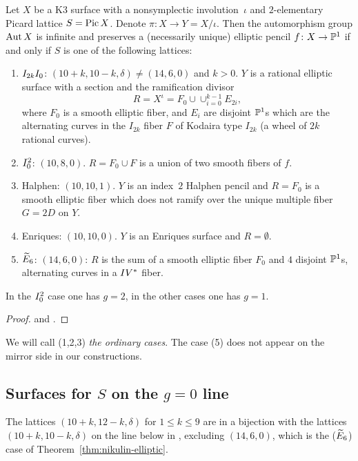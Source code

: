 \documentclass{amsart}
\begin{document}
\begin{theorem}[Nikulin]\label{thm:nikulin-elliptic}
  Let $X$ be a K3 surface with a nonsymplectic involution~$\iota$ and
  $2$-elementary Picard lattice $S=\operatorname{Pic} X$. Denote
  $\pi\colon X\to Y= X/\iota$.  Then the automorphism group $\operatorname{Aut} X$
  is infinite and preserves a (necessarily unique) elliptic pencil
  $f\colon X\to{\mathbb P}^1$ if and only if $S$ is one of the following lattices:
  \begin{enumerate}
  \item $I_{2k}I_0$:
    $(10+k, 10-k, \delta)\ne (14,6,0)$ and
    $k>0$. $Y$ is a rational elliptic surface with a section and 
    the ramification divisor $$R=X^\iota = F_0\cup\cup_{i=0}^{k-1} E_{2i},$$ where $F_0$ is a 
    smooth elliptic fiber, and $E_i$ are disjoint ${\mathbb P}^1$s which are the
    alternating curves in the $I_{2k}$ fiber $F$ of Kodaira
    type $I_{2k}$ (a wheel of $2k$ rational curves).
  \item $I_0^2$: $(10,8,0)$. $R=F_0\cup F$ is a union of two smooth
    fibers of $f$.
  \item Halphen: $(10,10,1)$. $Y$ is an index~$2$ Halphen pencil and
    $R = F_0$ is a smooth elliptic fiber which does not ramify over
    the unique multiple fiber $G=2D$ on $Y$. 
      \item Enriques:
    $(10,10,0)$. $Y$ is an Enriques surface and $R=\emptyset$.

  \item ${\widetilde E}_6$: $(14,6,0)$: $R$ is the sum of a smooth elliptic fiber $F_0$ 
  and $4$ disjoint ${\mathbb P}^1$s, alternating curves in a $IV^*$ fiber.
  \end{enumerate}
  In the $I_0^2$ case one has $g=2$, in the other cases one has $g=1$.
\end{theorem}
\begin{proof}
  \cite[Sec.~4]{nikulin1981quotient-groups} and
  \cite{nikulin2020some-examples}. 
\end{proof}

We will call (1,2,3) \emph{the ordinary cases}. The case (5) does not
appear on the mirror side in our constructions.

\subsection{Surfaces for $S$ on the $g=0$ line}
\label{sec:k3-g=0}

The lattices %
$(10+k,12-k,\delta)$ for $1\le k\le 9$
are in a
bijection with the lattices %
$(10+k,10-k,\delta)$
on the line below in \fign,
excluding $(14,6,0)$, which is the (${\widetilde E}_6$) case of
Theorem~\ref{thm:nikulin-elliptic}.
\end{document}
